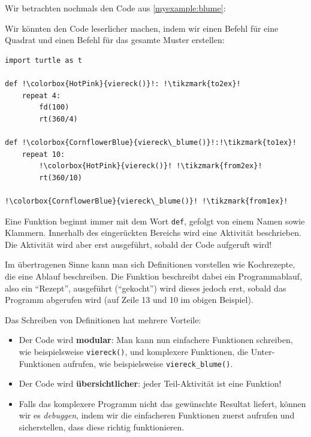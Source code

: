\begin{myexample}
Wir betrachten nochmals den Code aus \cref{myexample:blume}:



Wir könnten den Code leserlicher machen, indem wir einen Befehl für eine Quadrat und einen Befehl für das gesamte Muster erstellen:

\begin{lstlisting}[escapechar=!]
import turtle as t

def !\colorbox{HotPink}{viereck()}!: !\tikzmark{to2ex}!
    repeat 4:
        fd(100)
        rt(360/4)

def !\colorbox{CornflowerBlue}{viereck\_blume()}!:!\tikzmark{to1ex}! 
    repeat 10:
        !\colorbox{HotPink}{viereck()}! !\tikzmark{from2ex}!
        rt(360/10)

!\colorbox{CornflowerBlue}{viereck\_blume()}! !\tikzmark{from1ex}!
\end{lstlisting}

Eine Funktion beginnt immer mit dem Wort \lstinline|def|, gefolgt von einem Namen sowie Klammern. Innerhalb des eingerückten Bereichs wird eine Aktivität beschrieben. Die Aktivität wird aber erst ausgeführt, sobald der Code aufgeruft wird!

Im übertragenen Sinne kann man sich Definitionen vorstellen wie Kochrezepte, die eine Ablauf beschreiben. Die Funktion beschreibt dabei ein Programmablauf, also ein ``Rezept'', ausgeführt (``gekocht'') wird dieses jedoch erst, sobald das Programm abgerufen wird (auf Zeile 13 und 10 im obigen Beispiel).

Das Schreiben von Definitionen hat mehrere Vorteile:
\begin{itemize}
\item Der Code wird \textbf{modular}: Man kann nun einfachere Funktionen schreiben, wie beispielsweise \lstinline|viereck()|, und komplexere Funktionen, die Unter-Funktionen aufrufen, wie beispielsweise \lstinline|viereck_blume()|.
\item Der Code wird \textbf{übersichtlicher}: jeder Teil-Aktivität ist eine Funktion!
\item Falls das komplexere Programm nicht das gewünschte Resultat liefert, können wir es \textit{debuggen}, indem wir die einfacheren Funktionen zuerst aufrufen und sicherstellen, dass diese richtig funktionieren.
\end{itemize}


\end{myexample}
